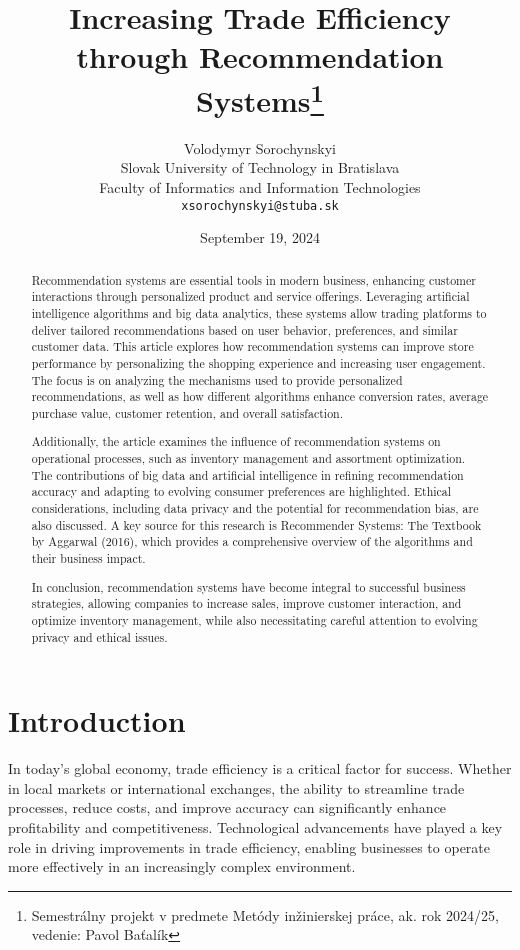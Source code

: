 \documentclass[10pt,twoside,slovak,a4paper]{article}
\title{Increasing Trade Efficiency through Recommendation Systems\thanks{Semestrálny projekt v predmete Metódy inžinierskej práce, ak. rok 2024/25, vedenie: Pavol Baťalík}} %
\author{Volodymyr Sorochynskyi\\[2pt]
	{\small Slovak University of Technology in Bratislava}\\
	{\small Faculty of Informatics and Information Technologies}\\
	{\small \texttt{xsorochynskyi@stuba.sk}}
	}
\date{\small September 19, 2024} %
\begin{document}
\maketitle

\begin{abstract}
Recommendation systems are essential tools in modern business, enhancing customer interactions through personalized product and service offerings. Leveraging artificial intelligence algorithms and big data analytics, these systems allow trading platforms to deliver tailored recommendations based on user behavior, preferences, and similar customer data. This article explores how recommendation systems can improve store performance by personalizing the shopping experience and increasing user engagement. The focus is on analyzing the mechanisms used to provide personalized recommendations, as well as how different algorithms enhance conversion rates, average purchase value, customer retention, and overall satisfaction.

Additionally, the article examines the influence of recommendation systems on operational processes, such as inventory management and assortment optimization. The contributions of big data and artificial intelligence in refining recommendation accuracy and adapting to evolving consumer preferences are highlighted. Ethical considerations, including data privacy and the potential for recommendation bias, are also discussed. A key source for this research is Recommender Systems: The Textbook by Aggarwal (2016), which provides a comprehensive overview of the algorithms and their business impact.

In conclusion, recommendation systems have become integral to successful business strategies, allowing companies to increase sales, improve customer interaction, and optimize inventory management, while also necessitating careful attention to evolving privacy and ethical issues.
\end{abstract}



\section{Introduction}

In today’s global economy, trade efficiency is a critical factor for success. Whether in local markets or international exchanges, the ability to streamline trade processes, reduce costs, and improve accuracy can significantly enhance profitability and competitiveness. Technological advancements have played a key role in driving improvements in trade efficiency, enabling businesses to operate more effectively in an increasingly complex environment.
\end{document}
